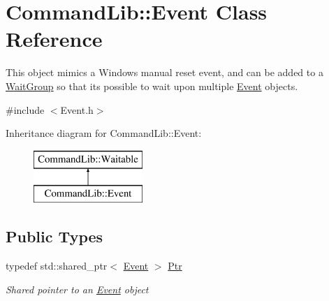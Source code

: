 \hypertarget{class_command_lib_1_1_event}{}\section{Command\+Lib\+:\+:Event Class Reference}
\label{class_command_lib_1_1_event}


This object mimics a Windows manual reset event, and can be added to a \mbox{\hyperlink{class_command_lib_1_1_wait_group}{Wait\+Group}} so that it\textquotesingle{}s possible to wait upon multiple \mbox{\hyperlink{class_command_lib_1_1_event}{Event}} objects.  




{\ttfamily \#include $<$Event.\+h$>$}

Inheritance diagram for Command\+Lib\+:\+:Event\+:\begin{figure}[H]
\begin{center}
\leavevmode
\includegraphics[height=2.000000cm]{class_command_lib_1_1_event}
\end{center}
\end{figure}
\subsection*{Public Types}
\begin{DoxyCompactItemize}
\item 
typedef std\+::shared\+\_\+ptr$<$ \mbox{\hyperlink{class_command_lib_1_1_event}{Event}} $>$ \mbox{\hyperlink{class_command_lib_1_1_event_a3ac4eb982c0456c1216859a61198c073}{Ptr}}
\begin{DoxyCompactList}\small\item\em Shared pointer to an \mbox{\hyperlink{class_command_lib_1_1_event}{Event}} object\end{DoxyCompactList}\end{DoxyCompactItemize}
